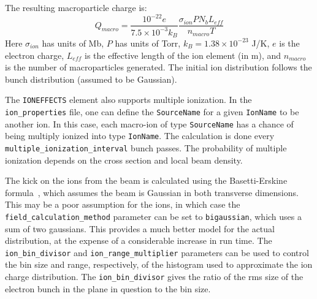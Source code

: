 The resulting macroparticle charge is:
\begin{equation}
Q_{macro} = \frac{10^{-22} e}{7.5\times10^{-3} k_B} \frac{\sigma_{ion} P N_b L_{eff}}{n_{macro} T}
\end{equation}
Here $\sigma_{ion}$ has units of Mb, $P$ has units of Torr, $k_B = 1.38\times10^{-23}$ J/K, $e$ is the electron charge, $L_{eff}$ is the effective length of the ion element (in m), and $n_{macro}$ is the number of macroparticles generated.
The initial ion distribution follows the bunch distribution (assumed to be Gaussian).

The \verb|IONEFFECTS| element also supports multiple ionization.  In the \verb|ion_properties| file, one can define the \verb|SourceName| for a given \verb|IonName| to be another ion.  In this case, each macro-ion of type \verb|SourceName| has a chance of being multiply ionized into type \verb|IonName|.  The calculation is done every \verb|multiple_ionization_interval| bunch passes.  The probability of multiple ionization depends on the cross section and local beam density.



The kick on the ions from the beam is calculated using the
Basetti-Erskine formula~\cite{Bassetti}, which assumes the beam is
Gaussian in both transverse dimensions.  This may be a poor assumption for
the ions, in which case the \verb|field_calculation_method| parameter can be
set to \verb|bigaussian|, which uses a sum of two gaussians. This provides
a much better model for the actual distribution, at the expense of a considerable
increase in run time. The \verb|ion_bin_divisor| and \verb|ion_range_multiplier| parameters can
be used to control the bin size and range, respectively, of the histogram used to 
approximate the ion charge distribution.
The \verb|ion_bin_divisor| gives the ratio of the rms size of the electron bunch
in the plane in question to the bin size.

